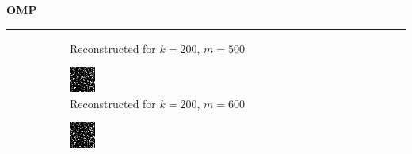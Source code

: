 \documentclass[a4paper,12pt]{article}
\newenvironment{solution}[2][]{%
    \begin{mdframed}[linecolor=blue!70!black, linewidth=2pt, roundcorner=10pt, backgroundcolor=yellow!10!white, skipabove=12pt, skipbelow=12pt]%
        \textbf{\large #2}
        \par\noindent\rule{\textwidth}{0.4pt}
}{
    \end{mdframed}
}
\begin{document}
\begin{solution}{OMP}
\begin{figure}[H]
\begin{subfigure}[t]{0.23\textwidth}
        \caption{Reconstructed for $k = 200$, $m = 500$}
    \end{subfigure}
    \begin{subfigure}[t]{0.23\textwidth}
        \centering
        \includegraphics[width=\textwidth]{../images/omp/Reconstructed_k_200_m_600.png}
        \caption{Reconstructed for $k = 200$, $m = 600$}
    \end{subfigure}
    \begin{subfigure}[t]{0.23\textwidth}
        \centering
        \includegraphics[width=\textwidth]{../images/omp/Reconstructed_k_200_m_700.png}

\end{subfigure}
\end{figure}
\end{solution}
\end{document}
